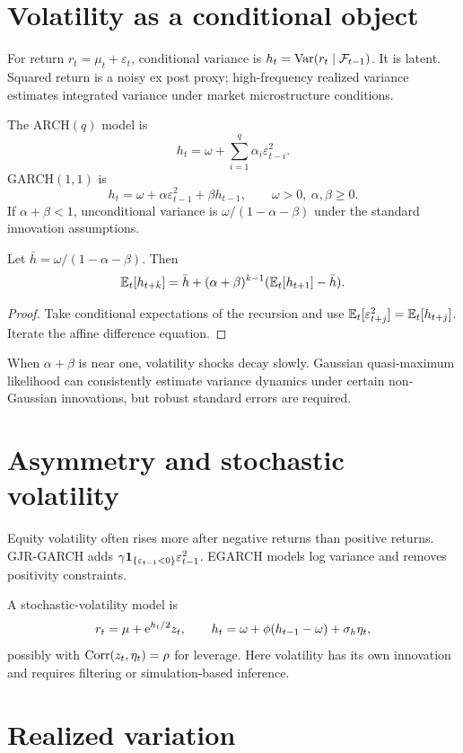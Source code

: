 \section{Volatility as a conditional object}

For return $r_t=\mu_t+\varepsilon_t$, conditional variance is
$h_t=\operatorname{Var}(r_t\mid\mathcal F_{t-1})$. It is latent. Squared return is a noisy ex post proxy;
high-frequency realized variance estimates integrated variance under market
microstructure conditions.

The ARCH$(q)$ model is
\[
h_t=\omega+\sum_{i=1}^q\alpha_i\varepsilon_{t-i}^2.
\]
GARCH$(1,1)$ is
\[
h_t=\omega+\alpha\varepsilon_{t-1}^2+\beta h_{t-1},
\qquad \omega>0,\ \alpha,\beta\geq0.
\]
If $\alpha+\beta<1$, unconditional variance is
$\omega/(1-\alpha-\beta)$ under the standard innovation assumptions.

\begin{proposition}
Let $\bar h=\omega/(1-\alpha-\beta)$. Then
\[
\operatorname{\mathbb E}_t[h_{t+k}]=\bar h+(\alpha+\beta)^{k-1}
(\operatorname{\mathbb E}_t[h_{t+1}]-\bar h).
\]
\end{proposition}
\begin{proof}
Take conditional expectations of the recursion and use
$\operatorname{\mathbb E}_t[\varepsilon_{t+j}^2]=\operatorname{\mathbb E}_t[h_{t+j}]$. Iterate the affine difference equation.
\end{proof}

When $\alpha+\beta$ is near one, volatility shocks decay slowly. Gaussian
quasi-maximum likelihood can consistently estimate variance dynamics under certain
non-Gaussian innovations, but robust standard errors are required.

\section{Asymmetry and stochastic volatility}

Equity volatility often rises more after negative returns than positive returns.
GJR-GARCH adds
$\gamma\mathbf 1_{\{\varepsilon_{t-1}<0\}}\varepsilon_{t-1}^2$. EGARCH models log
variance and removes positivity constraints.

A stochastic-volatility model is
\[
r_t=\mu+\mathrm e^{h_t/2}z_t,\qquad
h_t=\omega+\phi(h_{t-1}-\omega)+\sigma_h\eta_t,
\]
possibly with $\operatorname{Corr}(z_t,\eta_t)=\rho$ for leverage. Here volatility has its own
innovation and requires filtering or simulation-based inference.

\section{Realized variation}

